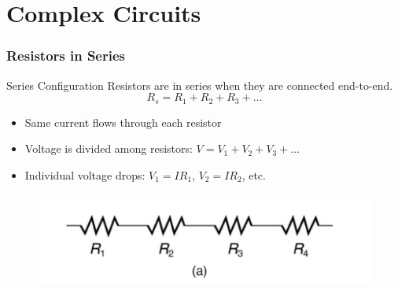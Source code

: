 \documentclass{beamer}
\begin{document}
\section{Complex Circuits}
\begin{frame}
    \frametitle{Resistors in Series}
    \begin{block}{Series Configuration}
        Resistors are in series when they are connected end-to-end.
        \[ R_s = R_1 + R_2 + R_3 + \ldots \]
    \end{block}
    \begin{itemize}
        \item Same current flows through each resistor
        \item Voltage is divided among resistors: $V = V_1 + V_2 + V_3 + \ldots$
        \item Individual voltage drops: $V_1 = IR_1$, $V_2 = IR_2$, etc.
    \end{itemize}
    \begin{center}
       \begin{figure}
           \centering
           \includegraphics[width=0.75\linewidth]{serres.png}
       \end{figure}
    \end{center}
\end{frame}
\end{document}
